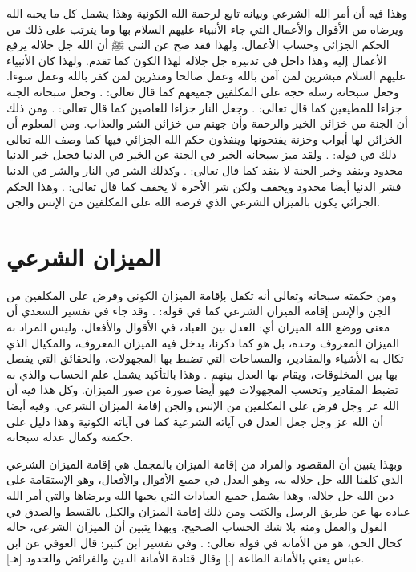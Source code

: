 وهذا فيه أن أمر الله الشرعي وبيانه تابع لرحمة الله الكونية وهذا يشمل كل ما يحبه الله ويرضاه من الأقوال والأعمال التي جاء الأنبياء عليهم السلام بها وما يترتب على ذلك من الحكم الجزائي وحساب الأعمال. ولهذا فقد صح عن النبي ﷺ أن الله جل جلاله يرفع الأعمال إليه وهذا داخل في تدبيره جل جلاله لهذا الكون كما تقدم. ولهذا كان الأنبياء عليهم السلام مبشرين لمن آمن بالله وعمل صالحا ومنذرين لمن كفر بالله وعمل سوءا. وجعل سبحانه رسله حجة على المكلفين جميعهم كما قال تعالى: \quranayah*[4][165]{\footnotesize \surahname*[4]}. وجعل سبحانه الجنة جزاءا للمطيعين كما قال تعالى: 
\quranayah*[3][133]{\footnotesize \surahname*[3]}.
وجعل النار جزاءا للعاصين كما قال تعالى: 
\quranayah*[3][131]{\footnotesize \surahname*[3]}. ومن ذلك أن الجنة من خزائن الخير والرحمة وأن جهنم من خزائن الشر والعذاب. ومن المعلوم أن الخزائن لها أبواب وخزنة يفتحونها وينفذون حكم الله الجزائي فيها كما وصف الله تعالى ذلك في قوله: 
\quranayah*[39][71-74]{\footnotesize \surahname*[39]}. ولقد ميز سبحانه الخير في الجنة عن الخير في الدنيا فجعل خير الدنيا محدود وينفد وخير الجنة لا ينفد كما قال تعالى: 
\quranayah*[16][96]{\footnotesize \surahname*[16]}.
وكذلك الشر في النار والشر في الدنيا فشر الدنيا أيضا محدود ويخفف ولكن شر الأخرة لا يخفف كما قال تعالى: 
\quranayah*[2][162]{\footnotesize \surahname*[2]}. وهذا الحكم الجزائي يكون بالميزان الشرعي الذي فرضه الله على المكلفين من الإنس والجن. 


\section{الميزان الشرعي}

ومن حكمته سبحانه وتعالى أنه تكفل بإقامة الميزان الكوني وفرض على المكلفين من الجن والإنس إقامة الميزان الشرعي كما في قوله:
\quranayah*[55][7-9]{\footnotesize \surahname*[55]}. وقد جاء في تفسير السعدي أن معنى ووضع الله الميزان أي: العدل بين العباد، في الأقوال والأفعال، وليس المراد به الميزان المعروف وحده، بل هو كما ذكرنا، يدخل فيه الميزان المعروف، والمكيال الذي تكال به الأشياء والمقادير، والمساحات التي تضبط بها المجهولات، والحقائق التي يفصل بها بين المخلوقات، ويقام بها العدل بينهم \cite{tafsir_Saadi}. وهذا بالتأكيد يشمل علم الحساب والذي به تضبط المقادير وتحسب المجهولات فهو أيضا صورة من صور الميزان. وكل هذا فيه أن الله عز وجل فرض على المكلفين من الإنس والجن إقامة الميزان الشرعي. وفيه أيضا أن الله عز وجل جعل العدل في آياته الشرعية كما في آياته الكونية وهذا دليل على حكمته وكمال عدله سبحانه.

وبهذا يتبين أن المقصود والمراد من إقامة الميزان بالمجمل هي إقامة الميزان الشرعي الذي كلفنا الله جل جلاله به، وهو العدل في جميع الأقوال والأفعال، وهو الإستقامة على دين الله جل جلاله، وهذا يشمل جميع العبادات التي يحبها الله ويرضاها والتي أمر الله عباده بها عن طريق الرسل والكتب ومن ذلك إقامة الميزان والكيل بالقسط والصدق في القول والعمل ومنه بلا شك الحساب الصحيح. وبهذا يتبين أن الميزان الشرعي، حاله كحال الحق، هو من الأمانة في قوله تعالى:
\quranayah*[33][72]{\footnotesize \surahname*[33]}. وفي تفسير ابن كثير: قال العوفي عن ابن عباس يعني بالأمانة الطاعة [.] وقال قتادة الأمانة الدين والفرائض والحدود [هـ].

